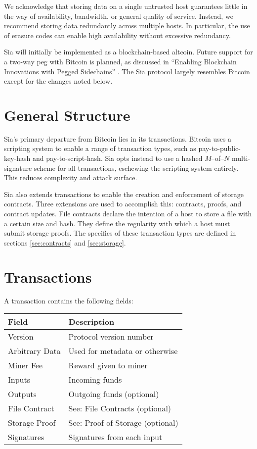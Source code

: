 \documentclass[twocolumn]{article}
\begin{document}
We acknowledge that storing data on a single untrusted host guarantees little in the way of availability, bandwidth, or general quality of service.
Instead, we recommend storing data redundantly across multiple hosts.
In particular, the use of erasure codes can enable high availability without excessive redundancy.

Sia will initially be implemented as a blockchain-based altcoin.
Future support for a two-way peg with Bitcoin is planned, as discussed in ``Enabling Blockchain Innovations with Pegged Sidechains'' \cite{side}.
The Sia protocol largely resembles Bitcoin except for the changes noted below.

\section{General Structure}
Sia's primary departure from Bitcoin lies in its transactions.
Bitcoin uses a scripting system to enable a range of transaction types, such as pay-to-public-key-hash and pay-to-script-hash.
Sia opts instead to use a hashed $M$--of--$N$ multi-signature scheme for all transactions, eschewing the scripting system entirely.
This reduces complexity and attack surface.

Sia also extends transactions to enable the creation and enforcement of storage contracts.
Three extensions are used to accomplish this: contracts, proofs, and contract updates.
File contracts declare the intention of a host to store a file with a certain size and hash.
They define the regularity with which a host must submit storage proofs.
The specifics of these transaction types are defined in sections \ref{sec:contracts} and \ref{sec:storage}.

\section{Transactions}
A transaction contains the following fields: \\

\noindent
\begin{tabular}{ l | l }
	\textbf{Field} & \textbf{Description} \\ \hline
	Version        & Protocol version number \\
	Arbitrary Data & Used for metadata or otherwise \\
	Miner Fee      & Reward given to miner \\
	Inputs         & Incoming funds \\
	Outputs        & Outgoing funds (optional) \\
	File Contract  & See: File Contracts (optional) \\
	Storage Proof  & See: Proof of Storage (optional) \\
	Signatures     & Signatures from each input \\
\end{tabular}
\end{document}
